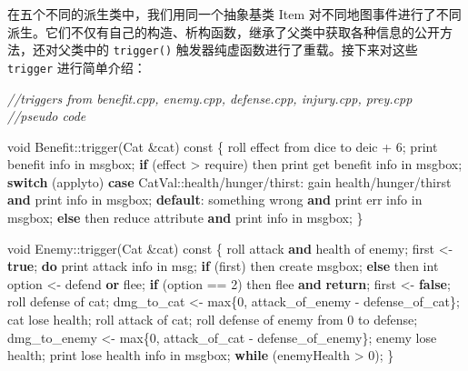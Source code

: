 \documentclass[hyperref,UTF8,a4paper]{ctexart}
\newenvironment{Shaded}{}{}
\newcommand{\AttributeTok}[1]{\textcolor[rgb]{0.49,0.56,0.16}{#1}}
\newcommand{\CommentTok}[1]{\textcolor[rgb]{0.38,0.63,0.69}{\textit{#1}}}
\newcommand{\ControlFlowTok}[1]{\textcolor[rgb]{0.00,0.44,0.13}{\textbf{#1}}}
\newcommand{\DataTypeTok}[1]{\textcolor[rgb]{0.56,0.13,0.00}{#1}}
\newcommand{\DecValTok}[1]{\textcolor[rgb]{0.25,0.63,0.44}{#1}}
\newcommand{\KeywordTok}[1]{\textcolor[rgb]{0.00,0.44,0.13}{\textbf{#1}}}
\newcommand{\NormalTok}[1]{#1}
\begin{document}
在五个不同的派生类中，我们用同一个抽象基类 Item
对不同地图事件进行了不同派生。它们不仅有自己的构造、析构函数，继承了父类中获取各种信息的公开方法，还对父类中的
\texttt{trigger()} 触发器纯虚函数进行了重载。接下来对这些
\texttt{trigger} 进行简单介绍：

\begin{Shaded}
\begin{Highlighting}[]
\CommentTok{//triggers from benefit.cpp, enemy.cpp, defense.cpp, injury.cpp, prey.cpp}
\CommentTok{//pseudo code}

\DataTypeTok{void}\NormalTok{ Benefit::trigger(Cat &cat) }\AttributeTok{const}
\NormalTok{\{}
\NormalTok{    roll effect from dice to deic + }\DecValTok{6}\NormalTok{;}
\NormalTok{    print benefit info in msgbox;}
    \ControlFlowTok{if}\NormalTok{ (effect > require) then}
\NormalTok{        print get benefit info in msgbox;}
        \ControlFlowTok{switch}\NormalTok{ (applyto)}
        \ControlFlowTok{case}\NormalTok{ CatVal::health/hunger/thirst: gain health/hunger/thirst }\KeywordTok{and}\NormalTok{ print info in msgbox;}
        \ControlFlowTok{default}\NormalTok{: something wrong }\KeywordTok{and}\NormalTok{ print err info in msgbox;}
    \ControlFlowTok{else}\NormalTok{ then}
\NormalTok{        reduce attribute }\KeywordTok{and}\NormalTok{ print info in msgbox;}
\NormalTok{\}}

\DataTypeTok{void}\NormalTok{ Enemy::trigger(Cat &cat) }\AttributeTok{const}
\NormalTok{\{}
\NormalTok{    roll attack }\KeywordTok{and}\NormalTok{ health of enemy;}
\NormalTok{    first <- }\KeywordTok{true}\NormalTok{;}
    \ControlFlowTok{do}
\NormalTok{        print attack info in msg;}
        \ControlFlowTok{if}\NormalTok{ (first) then}
\NormalTok{            create msgbox;}
        \ControlFlowTok{else}\NormalTok{ then}
            \DataTypeTok{int}\NormalTok{ option <- defend }\KeywordTok{or}\NormalTok{ flee;}
            \ControlFlowTok{if}\NormalTok{ (option == }\DecValTok{2}\NormalTok{) then}
\NormalTok{                flee }\KeywordTok{and} \ControlFlowTok{return}\NormalTok{;}
\NormalTok{        first <- }\KeywordTok{false}\NormalTok{;}
\NormalTok{        roll defense of cat;}
\NormalTok{        dmg_to_cat <- max\{}\DecValTok{0}\NormalTok{, attack_of_enemy - defense_of_cat\};}
\NormalTok{        cat lose health;}
\NormalTok{        roll attack of cat;}
\NormalTok{        roll defense of enemy from }\DecValTok{0}\NormalTok{ to defense;}
\NormalTok{        dmg_to_enemy <- max\{}\DecValTok{0}\NormalTok{, attack_of_cat - defense_of_enemy\};}
\NormalTok{        enemy lose health;}
\NormalTok{        print lose health info in msgbox;}
    \ControlFlowTok{while}\NormalTok{ (enemyHealth > }\DecValTok{0}\NormalTok{);}
\NormalTok{\}}


\end{Highlighting}
\end{Shaded}
\end{document}
